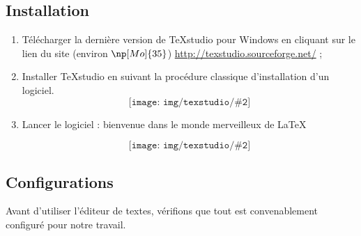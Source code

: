 \documentclass[10pt,openright,oneside,french]{book}
\newcommand{\texstudio}{{\sf TeXstudio}\xspace}
\newcommand{\windows}{{\sf Windows}\xspace}
\newcommand{\texstudioimg}[2][0.5]{\[\texttt{[image: img/texstudio/\#2]}\]}
\begin{document}
\subsection{Installation}

\begin{enumerate}
    \item Télécharger la dernière version de \texstudio pour \windows en cliquant sur le lien du site (environ $\np[Mo]{35}$) \url{http://texstudio.sourceforge.net/} ;
    \item Installer \texstudio en suivant la procédure classique d'installation d'un logiciel.
    	\texstudioimg[0.5]{TeXstudio_installation}
    \item Lancer le logiciel : bienvenue dans le monde merveilleux de \LaTeX\quad {\Large \smiley}

    	\texstudioimg[0.5]{TeXstudio_presentation}
\end{enumerate}

\subsection{Configurations}
Avant d'utiliser l'éditeur de textes, vérifions que tout est convenablement configuré pour notre travail.
\end{document}
